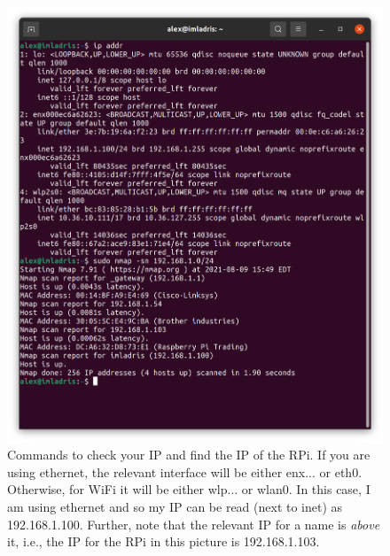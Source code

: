 \documentclass[11pt, letterpaper]{article}
\begin{document}
\begin{figure}[H]
    \centering
    \includegraphics[width=17cm]{find_ip.png}
    \caption{ Commands to check your IP and find the IP of the RPi. If you are using ethernet, the relevant interface will be either enx... or eth0. Otherwise, for WiFi it will be either wlp... or wlan0. In this case, I am using ethernet and so my IP can be read (next to inet) as 192.168.1.100. Further, note that the relevant IP for a name is {\it above} it, i.e., the IP for the RPi in this picture is 192.168.1.103.}
    \label{fig:find_ip}
\end{figure}
\end{document}
